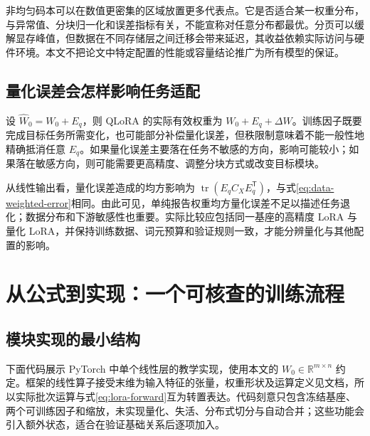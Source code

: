 \documentclass[UTF8,12pt,a4paper,fontset=fandol]{ctexart}
\begin{document}
非均匀码本可以在数值更密集的区域放置更多代表点。它是否适合某一权重分布，与异常值、分块归一化和误差指标有关，不能宣称对任意分布都最优。分页可以缓解显存峰值，但数据在不同存储层之间迁移会带来延迟，其收益依赖实际访问与硬件环境。本文不把论文中特定配置的性能或容量结论推广为所有模型的保证。

\subsection{量化误差会怎样影响任务适配}

设 $\widehat W_0=W_0+E_q$，则 QLoRA 的实际有效权重为
$W_0+E_q+\Delta W$。训练因子既要完成目标任务所需变化，也可能部分补偿量化误差，但秩限制意味着不能一般性地精确抵消任意 $E_q$。如果量化误差主要落在任务不敏感的方向，影响可能较小；如果落在敏感方向，则可能需要更高精度、调整分块方式或改变目标模块。

从线性输出看，量化误差造成的均方影响为
$\operatorname{tr}(E_qC_XE_q^{\mathsf T})$，与式\eqref{eq:data-weighted-error}相同。由此可见，单纯报告权重均方量化误差不足以描述任务退化；数据分布和下游敏感性也重要。实际比较应包括同一基座的高精度 LoRA 与量化 LoRA，并保持训练数据、词元预算和验证规则一致，才能分辨量化与其他配置的影响。

\section{从公式到实现：一个可核查的训练流程}
\label{sec:implementation}

\subsection{模块实现的最小结构}

下面代码展示 PyTorch 中单个线性层的教学实现，使用本文的 $W_0\in\mathbb R^{m\times n}$ 约定。框架的线性算子接受末维为输入特征的张量，权重形状及运算定义见文档\cite{pytorch-linear}，所以实际批次运算与式\eqref{eq:lora-forward}互为转置表达。代码刻意只包含冻结基座、两个可训练因子和缩放，未实现量化、失活、分布式切分与自动合并；这些功能会引入额外状态，适合在验证基础关系后逐项加入。
\end{document}
